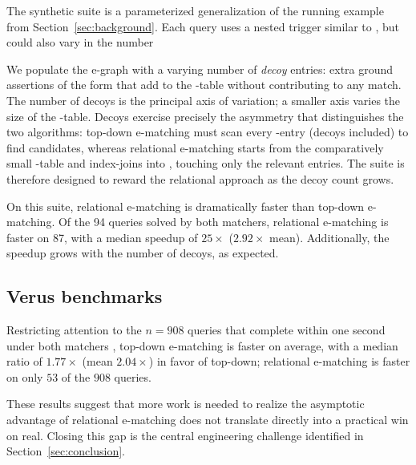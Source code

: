 The synthetic suite is a parameterized generalization of the running example
from Section~\ref{sec:background}. Each query uses a nested trigger similar to
, but could also vary in the number 

We populate the e-graph with a varying number of
\emph{decoy} entries: extra ground assertions of the form 
that add to the -table without contributing to any match. The number
of decoys is the principal axis of variation; a smaller axis varies the size
of the -table. Decoys exercise precisely the asymmetry that
distinguishes the two algorithms: top-down e-matching must scan every
-entry (decoys included) to find candidates, whereas relational
e-matching starts from the comparatively small -table and
index-joins into , touching only the relevant entries. The suite is
therefore designed to reward the relational approach as the decoy count
grows.

On this suite, relational e-matching is dramatically faster than top-down
e-matching. Of the 94 queries solved by both matchers, relational e-matching is
faster on 87, with a median speedup of $25\times$ ($2.92\times$ mean). Additionally,
the speedup grows with the number of decoys, as expected. 

\subsection{Verus benchmarks}

 Restricting attention to
the $n = 908$ queries that complete within one second under both matchers
, top-down e-matching is faster on
average, with a median ratio of $1.77\times$ (mean $2.04\times$)
in favor of top-down; relational e-matching is faster on only $53$ of the
$908$ queries.

These results suggest that more work is needed to realize the asymptotic
advantage of relational e-matching does not translate directly into a practical
win on real. Closing this gap is the central engineering challenge
identified in Section~\ref{sec:conclusion}.
